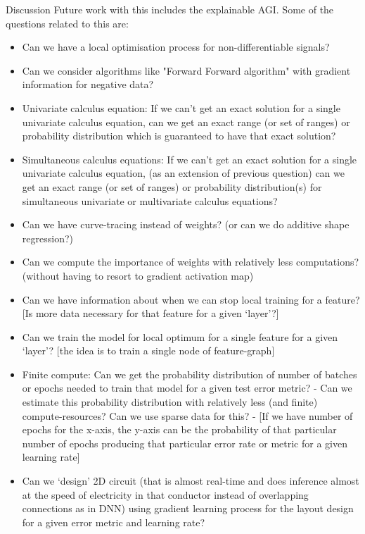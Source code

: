 \documentclass{article}
\begin{document}
\begin{section}{Discussion}
		Future work with this includes the explainable AGI. Some of the questions related to this are:
		\begin{itemize}
			\item Can we have a local optimisation process for non-differentiable signals?
			\item Can we consider algorithms like "Forward Forward algorithm" with gradient information for negative data?\cite{FFA}
			\item Univariate calculus equation: If we can't get an exact solution for a single univariate calculus equation, can we get an exact range (or set of ranges) or probability distribution which is guaranteed to have that exact solution?
			\item Simultaneous calculus equations: If we can't get an exact solution for a single univariate calculus equation, (as an extension of previous question) can we get an exact range (or set of ranges) or probability distribution(s) for simultaneous univariate or multivariate calculus equations? 
			\item Can we have curve-tracing instead of weights? (or can we do additive shape regression?)
			\item Can we compute the importance of weights with relatively less computations? (without having to resort to gradient activation map)
			\item Can we have information about when we can stop local training for a feature? [Is more data necessary for that feature for a given `layer'?]
			\item Can we train the model for local optimum for a single feature for a given `layer'?
			[the idea is to train a single node of feature-graph]
			\item Finite compute: Can we get the probability distribution of number of batches or epochs needed to train that model for a given test error metric?
			\subitem - Can we estimate this probability distribution with relatively less (and finite) compute-resources? Can we use sparse data for this?
			\subitem - [If we have number of epochs for the x-axis, the y-axis can be the probability of that particular number of epochs producing that particular error rate or metric for a given learning rate]
			\item Can we `design' 2D circuit (that is almost real-time and does inference almost at the speed of electricity in that conductor instead of overlapping connections as in DNN) using gradient learning process for the layout design for a given error metric and learning rate?
		\end{itemize} 
	\end{section}
\end{document}
